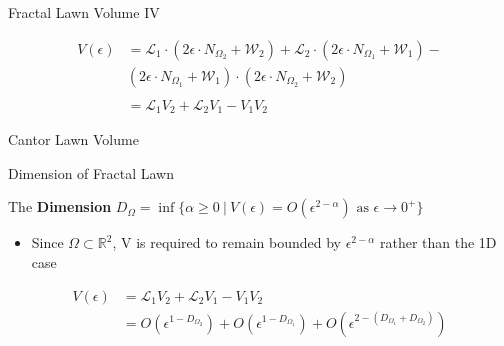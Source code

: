\documentclass{if-beamer}
\newcommand{\R}{\mathbb{R}}
\newcommand{\SL}{\mathcal{L}}
\newcommand{\W}{\mathcal{W}}
\newcommand{\Om}{\Omega}
\begin{document}
\begin{frame}{Fractal Lawn Volume IV}
	\begin{center}
		\begin{align*}
		V(\epsilon) &= \SL_1 \cdot (2\epsilon \cdot N_{\Om_2} + \W_2) + \SL_2 \cdot (2\epsilon \cdot N_{\Om_1} + \W_1) - 		\\
		&(2\epsilon \cdot N_{\Om_1} + \W_1) \cdot (2\epsilon \cdot N_{\Om_2} + \W_2) \\ \\
		&= \SL_1 V_2 + \SL_2 V_1 - V_1 V_2
		\end{align*}
	\end{center}
\end{frame}


\begin{frame}{Cantor Lawn Volume}
	\begin{center}
	\end{center}
\end{frame}

\begin{frame}{Dimension of Fractal Lawn}

\begin{definition}
	The {\bf Dimension} $D_{\Om} = \inf\{\alpha \geq 0\ |\ V(\epsilon) = O(\epsilon^{2 - \alpha})\text{ as }\epsilon \to 0^+\}$
\end{definition}
\pause
\begin{itemize}
	\item Since $\Om \subset \R^2$, V is required to remain bounded by $\epsilon^{2-\alpha}$ rather than the 1D case   
\end{itemize}
\pause
\vspace{0.2in}

\begin{align*}
V(\epsilon) &= \SL_1 V_2 + \SL_2 V_1 - V_1 V_2 \\
&= O(\epsilon^{1-D_{\Om_2}}) + O(\epsilon^{1-D_{\Om_1}}) + O(\epsilon^{2-(D_{\Om_1} + D_{\Om_2})})
\end{align*}

\end{frame}
\end{document}
